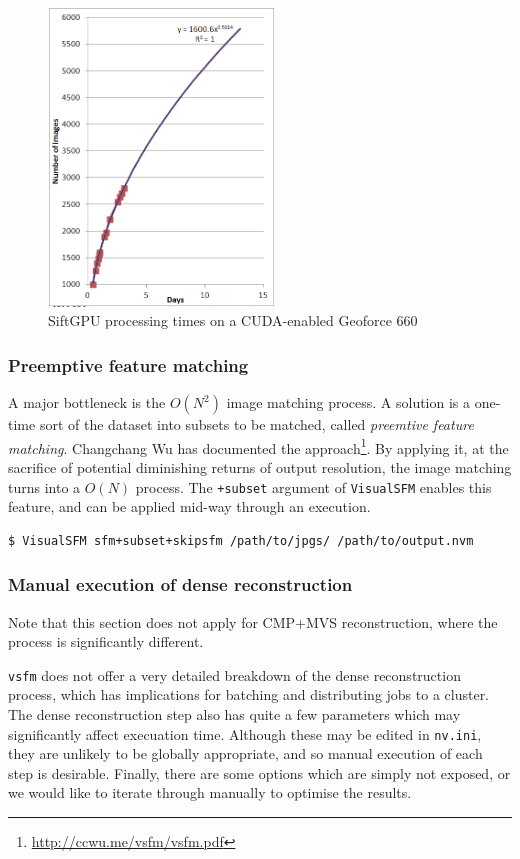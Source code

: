 \documentclass{article}
\begin{document}
\begin{figure}[h]
\begin{center}
\includegraphics[width=6cm]{siftgpu_processing_times}
\caption{SiftGPU processing times on a CUDA-enabled Geoforce 660}
\end{center}
\end{figure}

\subsubsection{Preemptive feature matching}

A major bottleneck is the $O(N^2)$ image matching process. A solution is a one-time sort of the dataset into subsets to be matched, called \emph{preemtive feature matching}. Changchang Wu has documented the approach\footnote{\url{http://ccwu.me/vsfm/vsfm.pdf}}. By applying it, at the sacrifice of potential diminishing returns of output resolution, the image matching turns into a $O(N)$ process. The {\tt +subset} argument of {\tt VisualSFM} enables this feature, and can be applied mid-way through an execution.

\begin{lstlisting}
$ VisualSFM sfm+subset+skipsfm /path/to/jpgs/ /path/to/output.nvm
\end{lstlisting}

\subsubsection{Manual execution of dense reconstruction}

Note that this section does not apply for CMP+MVS reconstruction, where the process is significantly different.

{\tt vsfm} does not offer a very detailed breakdown of the dense reconstruction process, which has implications for batching and distributing jobs to a cluster. The dense reconstruction step also has quite a few parameters which may significantly affect execuation time. Although these may be edited in {\tt nv.ini}, they are unlikely to be globally appropriate, and so manual execution of each step is desirable. Finally, there are some options which are simply not exposed, or we would like to iterate through manually to optimise the results.
\end{document}
